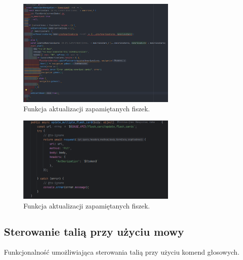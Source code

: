 \begin{figure}[H]
    \centering
    \includegraphics[width=0.7\textwidth]{chapters/chapter_8/screens/pass_unmemorized_flash_cards_web}
    \caption{Funkcja aktualizacji zapamiętanych fiszek.}
    \label{img:pass_unmemorized_flash_cards_web}
\end{figure}

\begin{figure}[H]
    \centering
    \includegraphics[width=0.7\textwidth]{chapters/chapter_8/screens/update_unmemorized_flash_cards_web}
    \caption{Funkcja aktualizacji zapamiętanych fiszek.}
    \label{img:update_unmemorized_flash_cards_web}
\end{figure}

\subsection{Sterowanie talią przy użyciu mowy}
Funkcjonalność umożliwiająca sterowania talią przy użyciu komend głosowych.


